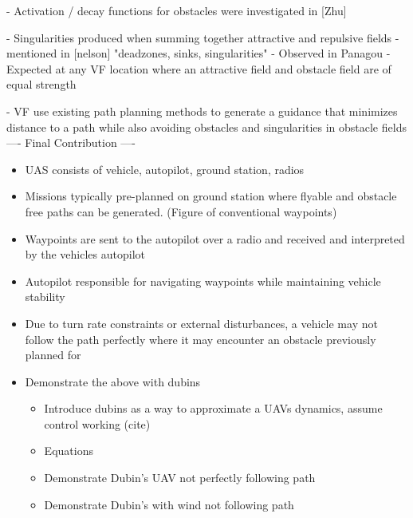 \documentclass[conf]{new-aiaa}
\begin{document}
- Activation / decay functions for obstacles were investigated in [Zhu]

- Singularities produced when summing together attractive and repulsive fields
	- mentioned in [nelson] "deadzones, sinks, singularities"
	- Observed in Panagou
	- Expected at any VF location where an attractive field and obstacle field are of equal strength

- VF use existing path planning methods to generate a guidance that minimizes distance to a path while also avoiding obstacles and singularities in obstacle fields
---- Final Contribution ----



	
\begin{itemize}
	\item UAS consists of vehicle, autopilot, ground station, radios
	\item Missions typically pre-planned on ground station where flyable and obstacle free paths can be generated. (Figure of conventional waypoints)
	\item Waypoints are sent to the autopilot over a radio and received and interpreted by the vehicles autopilot
	\item Autopilot responsible for navigating waypoints while maintaining vehicle stability
	\item Due to turn rate constraints or external disturbances, a vehicle may not follow the path perfectly where it may encounter an obstacle previously planned for
	\item Demonstrate the above with dubins
	\begin{itemize}
		\item Introduce dubins as a way to approximate a UAVs dynamics, assume control working (cite)
		\item Equations
		\item Demonstrate Dubin's UAV not perfectly following path
		\item Demonstrate Dubin's with wind not following path
	\end{itemize}
\end{itemize}
\end{document}
